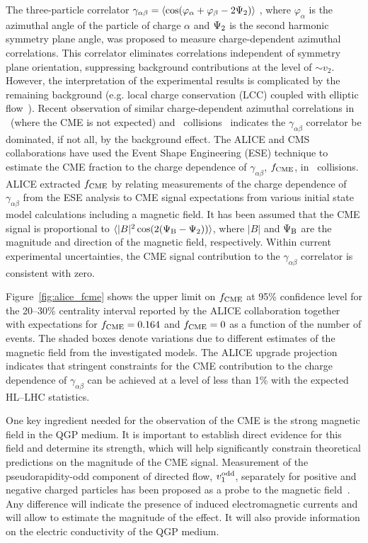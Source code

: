 The three-particle correlator $\gamma_{\alpha\beta} = \langle \cos(\varphi_{\alpha} + \varphi_{\beta} - 2\Psi_{\rm 2}) \rangle$ \cite{Voloshin:2004vk}, 
where $\varphi_{\alpha}$ is the azimuthal angle of the particle of charge $\alpha$ and $\Psi_{\rm 2}$ is the second harmonic symmetry plane 
angle, was proposed to measure charge-dependent azimuthal correlations. This correlator eliminates correlations independent of symmetry 
plane orientation, suppressing background contributions at the level of $\sim v_2$. However, the interpretation of the experimental results is 
complicated by the remaining background (e.g. local charge conservation (LCC) coupled with elliptic flow~\cite{Schlichting:2010qia, Pratt:2010zn}). 
Recent observation of similar charge-dependent azimuthal correlations in \ppb\ (where the CME is not expected) and 
\pbpb\ collisions~\cite{Khachatryan:2016got} indicates 
the $\gamma_{\alpha\beta}$ correlator be dominated, if not all, by the background effect.
The ALICE \cite{Acharya:2017fau} and CMS \cite{Sirunyan:2017quh} collaborations have used the Event Shape Engineering (ESE) technique 
\cite{Schukraft:2012ah} to estimate the CME fraction to the charge dependence of $\gamma_{\alpha\beta}$, $f_{\rm CME}$, in \pbpb\ collisions. 
ALICE extracted 
$f_{\rm CME}$ by relating measurements of the charge dependence of $\gamma_{\alpha\beta}$ from the ESE analysis to CME signal expectations from 
various initial state model calculations including a magnetic field. It has been assumed that the CME signal is proportional to 
$\langle |B|^2 \cos(2(\Psi_{\rm B} - \Psi_2)) \rangle$, where $|B|$ and $\Psi_{\rm B}$ are the magnitude and direction of the magnetic field, respectively. Within current experimental uncertainties, the CME signal contribution to the $\gamma_{\alpha\beta}$ correlator is consistent with zero.

Figure~\ref{fig:alice_fcme} shows the upper limit on $f_{\rm CME}$ at 95\% confidence level for the 20--30\% centrality interval reported by the 
ALICE collaboration together with expectations for $f_{\rm CME}=0.164$ and $f_{\rm CME}=0$ as a function of the number of events. The shaded 
boxes denote variations due to different estimates of the magnetic field from the investigated models. The ALICE upgrade projection indicates that 
stringent constraints for the CME contribution to the charge dependence of $\gamma_{\alpha\beta}$ can be achieved at a level of less than 1\% 
with the expected HL--LHC statistics. 

One key ingredient needed for the observation of the CME is the strong magnetic field in the QGP medium. It is important to establish direct
evidence for this field and determine its strength, which will help significantly constrain theoretical predictions on the magnitude of the CME signal. Measurement of the pseudorapidity-odd component of directed 
flow, $v_1^{\rm odd}$, separately for positive and negative charged particles has been proposed as a probe to 
the magnetic field~\cite{Gursoy:2014aka}. Any difference will indicate the presence of induced electromagnetic 
currents and will allow to estimate the magnitude of the effect. It will also provide information on the electric conductivity of the QGP medium.


